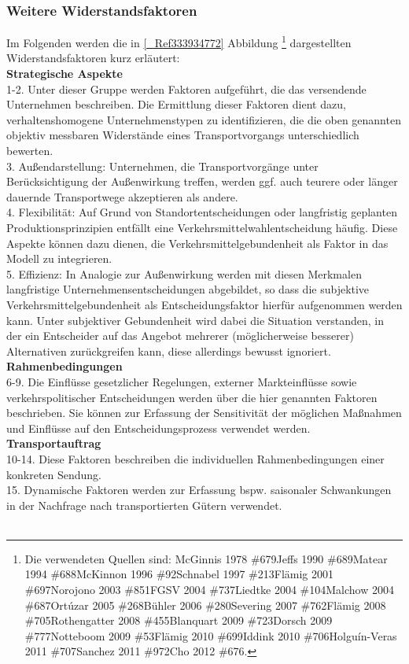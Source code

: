 \subsubsection{Weitere Widerstandsfaktoren}
\label{_Ref333942833}
\label{_Toc335661022}
\label{_Toc366766115}
\label{_Toc366775309}
Im Folgenden werden die in \autoref{_Ref333934772} Abbildung \footnote{%
 Die verwendeten Quellen sind: {McGinnis 1978 \#679}{Jeffs 1990 \#689}{Matear 1994 \#688}{McKinnon 1996 \#92}{Schnabel 1997 \#213}{Flämig 2001 \#697}{Norojono 2003 \#851}{FGSV 2004 \#737}{Liedtke 2004 \#104}{Malchow 2004 \#687}{Ortúzar 2005 \#268}{Bühler 2006 \#280}{Severing 2007 \#762}{Flämig 2008 \#705}{Rothengatter 2008 \#455}{Blanquart 2009 \#723}{Dorsch 2009 \#777}{Notteboom 2009 \#53}{Flämig 2010 \#699}{Iddink 2010 \#706}{Holguín-Veras 2011 \#707}{Sanchez 2011 \#972}{Cho 2012 \#676}.
}%
 dargestellten Widerstandsfaktoren kurz erläutert:~\\
\textbf{Strategische Aspekte}~\\
1-2. Unter dieser Gruppe werden Faktoren aufgeführt, die das versendende Unternehmen beschreiben. Die Ermittlung dieser Faktoren dient dazu, verhaltenshomogene Unternehmenstypen zu identifizieren, die die oben genannten objektiv messbaren Widerstände eines Transportvorgangs unterschiedlich bewerten.~\\
3. Außendarstellung: Unternehmen, die Transportvorgänge unter Berücksichtigung der Außenwirkung treffen, werden ggf. auch teurere oder länger dauernde Transportwege akzeptieren als andere. ~\\
4. Flexibilität: Auf Grund von Standortentscheidungen oder langfristig geplanten Produktionsprinzipien entfällt eine Verkehrsmittelwahlentscheidung häufig. Diese Aspekte können dazu dienen, die Verkehrsmittelgebundenheit als Faktor in das Modell zu integrieren.~\\
5. Effizienz: In Analogie zur Außenwirkung werden mit diesen Merkmalen langfristige Unternehmensentscheidungen abgebildet, so dass die subjektive Verkehrsmittelgebundenheit als Entscheidungsfaktor hierfür aufgenommen werden kann. Unter subjektiver Gebundenheit wird dabei die Situation verstanden, in der ein Entscheider auf das Angebot mehrerer (möglicherweise besserer) Alternativen zurückgreifen kann, diese allerdings bewusst ignoriert.~\\
\textbf{Rahmenbedingungen}~\\
6-9. Die Einflüsse gesetzlicher Regelungen, externer Markteinflüsse sowie verkehrspolitischer Entscheidungen werden über die hier genannten Faktoren beschrieben. Sie können zur Erfassung der Sensitivität der möglichen Maßnahmen und Einflüsse auf den Entscheidungsprozess verwendet werden.~\\
\textbf{Transportauftrag}~\\
10-14. Diese Faktoren beschreiben die individuellen Rahmenbedingungen einer konkreten Sendung. ~\\
15. Dynamische Faktoren werden zur Erfassung bspw. saisonaler Schwankungen in der Nachfrage nach transportierten Gütern verwendet.~\\
~\\

